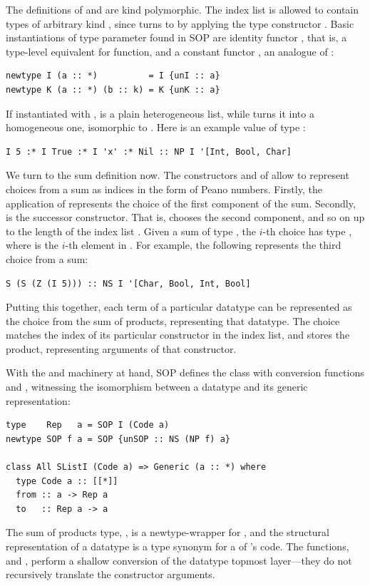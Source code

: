 \documentclass[sigplan,screen,review,anonymous]{acmart}
\begin{document}
The definitions of  and  are kind polymorphic. The index list is allowed to contain types of arbitrary kind , since  turns to \K{*} by applying the type constructor .
Basic instantiations of type parameter  found in SOP are identity functor , that is, a type-level equivalent for  function, and a constant functor , an analogue of :
\begin{lstlisting}[style=fancy]
newtype I (a :: *)          = I {unI :: a}
newtype K (a :: *) (b :: k) = K {unK :: a}
\end{lstlisting}
If instantiated with ,  is a plain heterogeneous list, while  turns it into a homogeneous one, isomorphic to \K{[.a]}. Here is an example value of type :
\begin{lstlisting}[style=fancy]
I 5 :* I True :* I 'x' :* Nil :: NP I '[Int, Bool, Char]
\end{lstlisting}

We turn to the sum definition now. The constructors  and  of  allow to represent choices from a sum as indices in the form of Peano numbers. Firstly, the application of  represents the choice of the first component of the sum. Secondly,  is the successor constructor. That is,  chooses the second component, and so on up to the length of the index list . Given a sum of type , the $i$-th choice has type , where  is the $i$-th element in . For example, the following represents the third choice from a sum:
\begin{lstlisting}[style=fancy]
S (S (Z (I 5))) :: NS I '[Char, Bool, Int, Bool]
\end{lstlisting}
Putting this together, each term of a particular datatype can be represented as the choice from the sum of products, representing that datatype. The choice matches the index of its particular constructor in the index list, and stores the product, representing arguments of that constructor.

With the  and  machinery at hand, SOP defines the  class with conversion functions  and , witnessing the isomorphism between a datatype and its generic representation:
\begin{lstlisting}[style=fancy]
type    Rep   a = SOP I (Code a)
newtype SOP f a = SOP {unSOP :: NS (NP f) a}

class All SListI (Code a) => Generic (a :: *) where
  type Code a :: [[*]]
  from :: a -> Rep a
  to   :: Rep a -> a
\end{lstlisting}
The sum of products type, , is a newtype-wrapper for , and the structural representation  of a datatype  is a type synonym for a  of 's code. The functions,  and , perform a shallow conversion of the datatype topmost layer---they do not recursively translate the constructor arguments.
\end{document}
